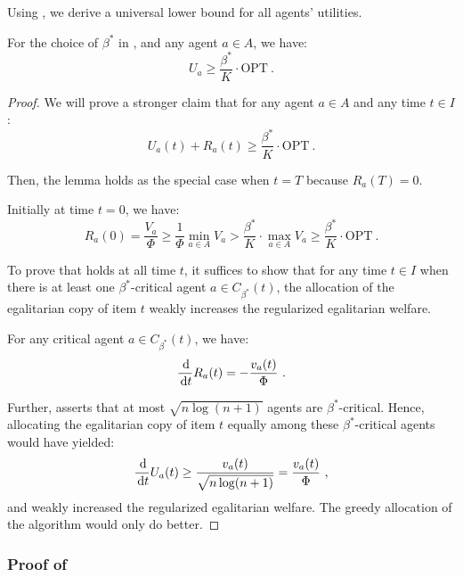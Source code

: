 \documentclass[11pt,letterpaper]{article}
\newcommand{\OPT}{\mathrm{OPT}}
\newcommand{\dif}[1]{\,\text{\rm d} #1}
\newcommand{\utility}{U}
\newcommand{\regularizer}{R}
\begin{document}
Using , we derive a universal lower bound for all agents' utilities.


\begin{lemma}
	\label{lem:negative-infinity-main-lemma-app}
	For the choice of $\beta^*$ in , and any agent $a \in A$, we have:
	\[
	\utility_a \ge \frac{\beta^*}{K} \cdot \OPT
	~.
	\]
\end{lemma}

\begin{proof}
	We will prove a stronger claim that for any agent $a \in A$ and any time $t \in I$:
	\begin{equation}
		\label{eqn:regularized-utility-app}
		\utility_a(t) + \regularizer_a(t) \ge \frac{\beta^*}{K} \cdot \OPT
		~.
	\end{equation}
	
	Then, the lemma holds as the special case when $t = T$ because $\regularizer_a(T) = 0$.
	
	Initially at time $t = 0$, we have:
	\[
	\regularizer_a(0) = \frac{V_a}{\Phi} \ge \frac{1}{\Phi} \min_{a\in A} V_a > \frac{\beta^*}{K} \cdot \max_{a\in A} V_a \ge \frac{\beta^*}{K} \cdot \OPT
	~.
	\]
	
	To prove that  holds at all time $t$, it suffices to show that for any time $t \in I$ when there is at least one $\beta^*$-critical agent $a \in C_{\beta^*}(t)$, the allocation of the egalitarian copy of item $t$ weakly increases the regularized egalitarian welfare.
	
	For any critical agent $a \in C_{\beta^*}(t)$, we have:
	\[
	\frac{\dif}{\dif{t}} \regularizer_a (t) = - \frac{v_a(t)}{\Phi}
	~.
	\] 
	
	Further,  asserts that at most $\sqrt{n \log(n+1)}$ agents are $\beta^*$-critical.
	Hence, allocating the egalitarian copy of item $t$ equally among these $\beta^*$-critical agents would have yielded:
	\[
	\frac{\dif}{\dif{t}} \utility_a(t) \ge \frac{v_a(t)}{\sqrt{n \log (n+1)}} = \frac{v_a(t)}{\Phi}
	~,
	\]
	and weakly increased the regularized egalitarian welfare. 
	The greedy allocation of the algorithm would only do better.
\end{proof}



\subsubsection{Proof of }
\end{document}
